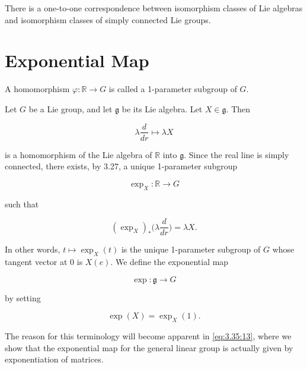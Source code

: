 \begin{theorem}\label{thm:3.28}
There is a one-to-one correspondence between isomorphism classes of Lie algebras and isomorphism classes of simply connected Lie groups.

\end{theorem}

\section{Exponential Map}

\begin{definition}\label{thm:3.29}
A homomorphism $\varphi: \mathbb{R} \to G$ is called a 1-parameter subgroup of $G$.

\end{definition}

\begin{definition}\label{thm:3.30}
Let $G$ be a Lie group, and let $\mathfrak{g}$ be its Lie algebra. Let $X\in\mathfrak{g}$. Then

\begin{equation}
\tag{1}\label{eq:3.30:1}
\lambda\frac{d}{d r}\mapsto\lambda X
\end{equation}

is a homomorphism of the Lie algebra of $\mathbb{R}$ into $\mathfrak{g}$. Since the real line is simply connected, there exists, by 3.27, a unique 1-parameter subgroup

\begin{equation}
\tag{2}\label{eq:3.30:2}
\exp_{X}\colon\mathbb{R}\to G
\end{equation}

such that

\begin{equation}
\tag{3}\label{eq:3.30:3}
(\exp_{X})_{*}\Big(\lambda\frac{d}{d r}\Big)=\lambda X.
\end{equation}

In other words, $t \mapsto \exp_{X}(t)$ is the unique 1-parameter subgroup of $G$ whose tangent vector at $0$ is $X(e)$. We define the exponential map

\begin{equation}
\tag{4}\label{eq:3.30:4}
\exp\colon\mathfrak{g}\to G
\end{equation}

by setting

\begin{equation}
\tag{5}\label{eq:3.30:5}
\exp(X)=\exp_{X}(1).
\end{equation}

The reason for this terminology will become apparent in \eqref{eq:3.35:13}, where we show that the exponential map for the general linear group is actually given by exponentiation of matrices.

\begin{center}
\end{center}

\end{definition}

